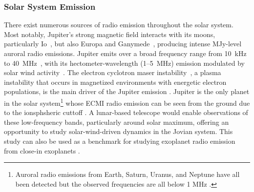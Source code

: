 \subsubsection{Solar System Emission} 
There exist numerous sources of radio emission throughout the solar system. Most notably, Jupiter's strong magnetic field interacts with its moons, particularly Io~\citep{Io}, but also Europa and Ganymede~\citep{Corentin}, producing intense MJy-level auroral radio emissions. Jupiter emits over a broad frequency range from 10~kHz to 40~MHz~\citep{zarka_auroral_1998}, with its hectometer-wavelength (1--5~MHz) emission modulated by solar wind activity~\citep{Desch1984}. The electron cyclotron maser instability~\citep[ECMI;][]{EMI}, a plasma instability that occurs in magnetized environments with energetic electron populations, is the main driver of the Jupiter emission \citep{zarka_auroral_1998}. Jupiter is the only planet in the solar system\footnote{Auroral radio emissions from Earth, Saturn, Uranus, and Neptune have all been detected but the observed frequencies are all below 1 MHz \citep{zarka_auroral_1998}.} whose ECMI radio emission can be seen from the ground due to the ionsphsheric cuttoff \citep{zarka_auroral_1998}. A lunar-based telescope would enable observations of these low-frequency bands, particularly around solar maximum, offering an opportunity to study solar-wind-driven dynamics in the Jovian system. This study can also be used as a benchmark for studying exoplanet radio emission from close-in exoplanets \citep{Zarka2007,joe_nature_review}. 



